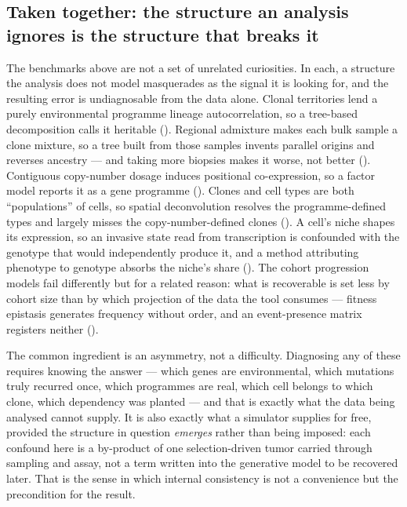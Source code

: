 \documentclass{article}
\begin{document}
\subsection{Taken together: the structure an analysis ignores is the structure that breaks it}
\label{sec:synthesis}
The benchmarks above are not a set of unrelated curiosities. In each, a structure the analysis does not
model masquerades as the signal it is looking for, and the resulting error is undiagnosable from the
data alone. Clonal territories lend a purely environmental programme lineage autocorrelation, so a
tree-based decomposition calls it heritable (). Regional admixture makes each bulk
sample a clone mixture, so a tree built from those samples invents parallel origins and reverses
ancestry --- and taking more biopsies makes it worse, not better (). Contiguous
copy-number dosage induces positional co-expression, so a factor model reports it as a gene programme
(). Clones and cell types are both ``populations'' of cells, so spatial
deconvolution resolves the programme-defined types and largely misses the copy-number-defined clones
(). A cell's niche shapes its expression, so an invasive state read from
transcription is confounded with the genotype that would independently produce it, and a method
attributing phenotype to genotype absorbs the niche's share (). The cohort
progression models fail differently but for a related reason: what
is recoverable is set less by cohort size than by which projection of the data the tool consumes ---
fitness epistasis generates frequency without order, and an event-presence matrix registers neither
().

The common ingredient is an asymmetry, not a difficulty. Diagnosing any of these requires knowing the
answer --- which genes are environmental, which mutations truly recurred once, which programmes are
real, which cell belongs to which clone, which dependency was planted --- and that is exactly what the
data being analysed cannot supply. It is also exactly what a simulator supplies for free, provided the
structure in question \emph{emerges} rather than being imposed: each confound here is a by-product of
one selection-driven tumor carried through sampling and assay, not a term written into the generative
model to be recovered later. That is the sense in which internal consistency is not a convenience but
the precondition for the result.
\end{document}
